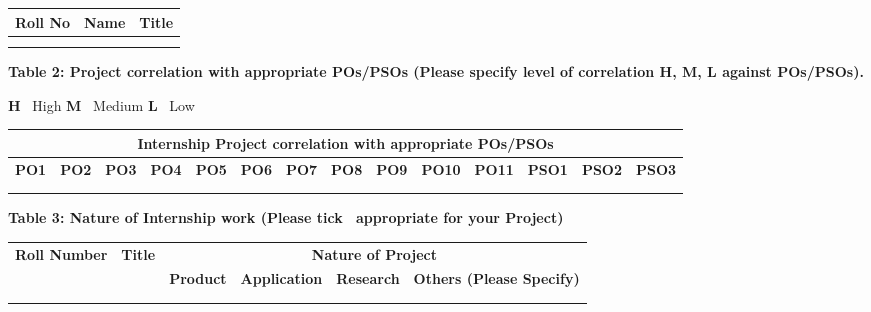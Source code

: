 \vspace{0.2cm}

\begin{table}[H]
\centering
\begin{tabularx}{\textwidth}{|p{3.5cm}|p{4.5cm}|X|}
\hline
\textbf{Roll No} & \textbf{Name} & \textbf{Title} \\
\hline
& & \\
& & \\
\hline
\end{tabularx}
\end{table}

\vspace{0.4cm}

\noindent \textbf{Table 2: Project correlation with appropriate POs/PSOs (Please specify level of correlation H, M, L against POs/PSOs).}

\vspace{0.1cm}
\noindent \textbf{H} \ High \qquad \textbf{M} \ Medium \qquad \textbf{L} \ Low

\vspace{0.3cm}

\begin{table}[H]
\centering
\small
\begin{tabular}{|c|c|c|c|c|c|c|c|c|c|c|c|c|c|}
\hline
\multicolumn{14}{|c|}{\textbf{Internship Project correlation with appropriate POs/PSOs}} \\
\hline
\textbf{PO1} & \textbf{PO2} & \textbf{PO3} & \textbf{PO4} & \textbf{PO5} & \textbf{PO6} & \textbf{PO7} & \textbf{PO8} & \textbf{PO9} & \textbf{PO10} & \textbf{PO11} & \textbf{PSO1} & \textbf{PSO2} & \textbf{PSO3} \\
\hline
& & & & & & & & & & & & & \\
& & & & & & & & & & & & & \\
\hline
\end{tabular}
\end{table}

\vspace{0.4cm}

\noindent \textbf{Table 3: Nature of Internship work (Please tick \checkmark\ appropriate for your Project)}

\vspace{0.2cm}

\begin{table}[H]
\centering
\begin{tabularx}{\textwidth}{|p{2.8cm}|p{3.8cm}|c|c|c|p{2.2cm}|}
\hline
\multirow{2}{*}{\textbf{Roll Number}} & \multirow{2}{*}{\textbf{Title}} & \multicolumn{4}{c|}{\textbf{Nature of Project}} \\
\cline{3-6}
& & \textbf{Product} & \textbf{Application} & \textbf{Research} & \textbf{Others (Please Specify)} \\
\hline
& & & & & \\
& & & & & \\
\hline
\end{tabularx}
\end{table}

